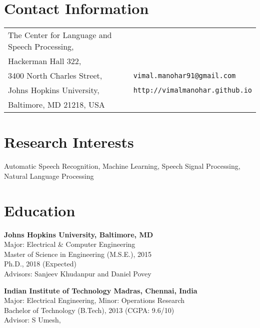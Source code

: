\documentclass[margin,line,pifont,palatino,courier]{res}
\begin{document}

\begin{resume}

\section{\sc Contact Information}

\vspace{.05in}
\begin{tabular}{l l}
The Center for Language and Speech Processing, \\
Hackerman Hall 322,\\
3400 North Charles Street,                        & \verb+vimal.manohar91@gmail.com+\\
Johns Hopkins University,                  & \verb+http://vimalmanohar.github.io+\\
Baltimore, MD 21218, USA               & \\
\end{tabular}

\section{\sc Research Interests}
Automatic Speech Recognition, Machine Learning, Speech Signal Processing, Natural Language Processing

\section{\sc Education}

\textbf{Johns Hopkins University, Baltimore, MD} \\
Major: Electrical \& Computer Engineering \\
Master of Science in Engineering (M.S.E.), 2015\\
Ph.D., 2018 (Expected) \\
Advisors: Sanjeev Khudanpur and Daniel Povey

\textbf{Indian Institute of Technology Madras, Chennai, India} \\
Major: Electrical Engineering, \quad Minor: Operations Research \\
Bachelor of Technology (B.Tech), 2013 (CGPA: 9.6/10) \\
Advisor: S Umesh, \\

\vspace{-2pt}


\end{resume}
\end{document}

